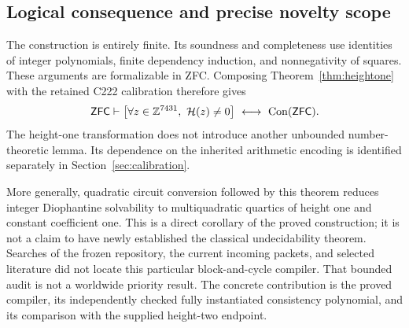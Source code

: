 \subsection{Logical consequence and precise novelty scope}

The construction is entirely finite. Its soundness and completeness use
identities of integer polynomials, finite dependency induction, and
nonnegativity of squares. These arguments are formalizable in ZFC.
Composing Theorem~\ref{thm:heightone} with the retained C222 calibration
therefore gives
\begin{equation}
 \mathsf{ZFC}\vdash
 \left[\forall z\in\mathbb Z^{7431},\ \mathcal H(z)\ne0\right]
 \ \longleftrightarrow\ \operatorname{Con}(\mathsf{ZFC}).
 \label{eq:heightone-consistency}
\end{equation}
The height-one transformation does not introduce another unbounded
number-theoretic lemma. Its dependence on the inherited arithmetic
encoding is identified separately in Section~\ref{sec:calibration}.

More generally, quadratic circuit conversion followed by this theorem
reduces integer Diophantine solvability to multiquadratic quartics of
height one and constant coefficient one. This is a direct corollary of
the proved construction; it is not a claim to have newly established
the classical undecidability theorem. Searches of the frozen repository,
the current incoming packets, and selected literature did not locate
this particular block-and-cycle compiler. That bounded audit is not a
worldwide priority result. The concrete contribution is the proved
compiler, its independently checked fully instantiated consistency
polynomial, and its comparison with the supplied height-two endpoint.
